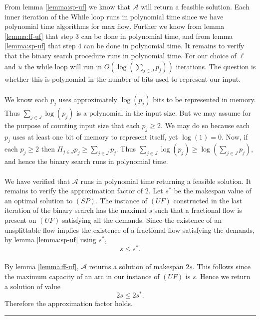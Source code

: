 \documentclass[letterpaper,12pt,oneside,onecolumn]{article}
\newcommand{\cA}{\mathcal{A}} \newcommand{\cB}{\mathcal{B}}
\newenvironment{proof}{{\bf Proof:  }}{\hfill\rule{2mm}{2mm}}
\begin{document}
\begin{proof}
From lemma \ref{lemma:sp-uf} we know that $\cA$ will return a feasible solution. Each inner iteration of the While loop runs in polynomial time since we have polynomial time algorithms for max flow. Further we know from lemma \ref{lemma:ff-uf} that step $3$ can be done in polynomial time, and from lemma \ref{lemma:sp-uf} that step $4$ can be done in polynomial time. It remains to verify that the binary search procedure runs in polynomial time. For our choice of $\ell$ and $u$ the while loop will run in $O(\log(\sum_{j \in J} p_j))$ iterations. The question is whether this is polynomial in the number of bits used to represent our input.
\paragraph{}
We know each $p_j$ uses approximately $\log(p_j)$ bits to be represented in memory. Thus $\sum_{j \in J} \log(p_j)$ is a polynomial in the input size. But we may assume for the purpose of counting input size that each $p_j \geq 2$. We may do so because each $p_j$ uses at least one bit of memory to represent itself, yet $\log(1) = 0$. Now, if each $p_j \geq 2$ then $\Pi_{j\in J} p_j \geq \sum_{j \in J} p_j$. Thus $\sum_{j \in J} \log(p_j) \geq \log(\sum_{j \in J} p_j)$, and hence the binary search runs in polynomial time.
\paragraph{}
We have verified that $\cA$ runs in polynomial time returning a feasible solution. It remains to verify the approximation factor of $2$. Let $s^*$ be the makespan value of an optimal solution to $(SP)$. The instance of $(UF)$ constructed in the last iteration of the binary search has the maximal $s$ such that a fractional flow is present on $(UF)$ satisfying all the demands. Since the existence of an unsplittable flow implies the existence of a fractional flow satisfying the demands, by lemma \ref{lemma:sp-uf} using $s^*$, $$s \leq s^*.$$
\paragraph{}
By lemma \ref{lemma:ff-uf}, $\cA$ returns a solution of makespan $2s$. This follows since the maximum capacity of an arc in our instance of $(UF)$ is $s$. Hence we return a solution of value
$$2s \leq 2s^*.$$
Therefore the approximation factor holds.
\end{proof}
\end{document}
